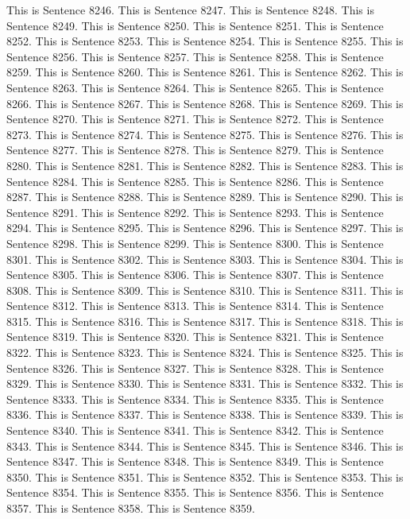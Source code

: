 \documentclass{article}
\begin{document}
This is Sentence 8246.
This is Sentence 8247.
This is Sentence 8248.
This is Sentence 8249.
This is Sentence 8250.
This is Sentence 8251.
This is Sentence 8252.
This is Sentence 8253.
This is Sentence 8254.
This is Sentence 8255.
This is Sentence 8256.
This is Sentence 8257.
This is Sentence 8258.
This is Sentence 8259.
This is Sentence 8260.
This is Sentence 8261.
This is Sentence 8262.
This is Sentence 8263.
This is Sentence 8264.
This is Sentence 8265.
This is Sentence 8266.
This is Sentence 8267.
This is Sentence 8268.
This is Sentence 8269.
This is Sentence 8270.
This is Sentence 8271.
This is Sentence 8272.
This is Sentence 8273.
This is Sentence 8274.
This is Sentence 8275.
This is Sentence 8276.
This is Sentence 8277.
This is Sentence 8278.
This is Sentence 8279.
This is Sentence 8280.
This is Sentence 8281.
This is Sentence 8282.
This is Sentence 8283.
This is Sentence 8284.
This is Sentence 8285.
This is Sentence 8286.
This is Sentence 8287.
This is Sentence 8288.
This is Sentence 8289.
This is Sentence 8290.
This is Sentence 8291.
This is Sentence 8292.
This is Sentence 8293.
This is Sentence 8294.
This is Sentence 8295.
This is Sentence 8296.
This is Sentence 8297.
This is Sentence 8298.
This is Sentence 8299.
This is Sentence 8300.
This is Sentence 8301.
This is Sentence 8302.
This is Sentence 8303.
This is Sentence 8304.
This is Sentence 8305.
This is Sentence 8306.
This is Sentence 8307.
This is Sentence 8308.
This is Sentence 8309.
This is Sentence 8310.
This is Sentence 8311.
This is Sentence 8312.
This is Sentence 8313.
This is Sentence 8314.
This is Sentence 8315.
This is Sentence 8316.
This is Sentence 8317.
This is Sentence 8318.
This is Sentence 8319.
This is Sentence 8320.
This is Sentence 8321.
This is Sentence 8322.
This is Sentence 8323.
This is Sentence 8324.
This is Sentence 8325.
This is Sentence 8326.
This is Sentence 8327.
This is Sentence 8328.
This is Sentence 8329.
This is Sentence 8330.
This is Sentence 8331.
This is Sentence 8332.
This is Sentence 8333.
This is Sentence 8334.
This is Sentence 8335.
This is Sentence 8336.
This is Sentence 8337.
This is Sentence 8338.
This is Sentence 8339.
This is Sentence 8340.
This is Sentence 8341.
This is Sentence 8342.
This is Sentence 8343.
This is Sentence 8344.
This is Sentence 8345.
This is Sentence 8346.
This is Sentence 8347.
This is Sentence 8348.
This is Sentence 8349.
This is Sentence 8350.
This is Sentence 8351.
This is Sentence 8352.
This is Sentence 8353.
This is Sentence 8354.
This is Sentence 8355.
This is Sentence 8356.
This is Sentence 8357.
This is Sentence 8358.
This is Sentence 8359.
\end{document}
